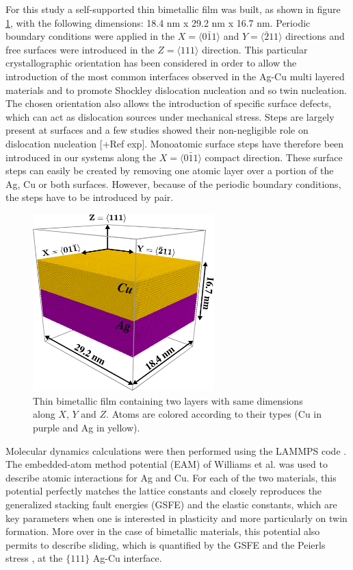 \documentclass[final,3p,times,twocolumn]{elsarticle}
\begin{document}
For this study a self-supported thin bimetallic film was built, as shown in figure \ref{fig_mod_geo}, with the following dimensions: 18.4 nm x 29.2 nm x 16.7 nm. Periodic boundary conditions were applied in the $X=\langle0\bar{1}1\rangle$ and $Y=\langle\bar{2}11\rangle$ directions and free surfaces were introduced in the $Z=\langle111\rangle$ direction. This particular crystallographic orientation has been considered in order to allow the introduction of the most common interfaces observed in the Ag-Cu multi layered materials and to promote Shockley dislocation nucleation and so twin nucleation. The chosen orientation also allows the introduction of specific surface defects, which can act as dislocation sources under mechanical stress. Steps are largely present at surfaces and a few studies showed their non-negligible role on dislocation nucleation \cite{brochard00PMA,hirel07SM} [+Ref exp]. Monoatomic surface steps have therefore been introduced in our systems along the $X=\langle0\bar{1}1\rangle$ compact direction. These surface steps can easily be created by removing one atomic layer over a portion of the Ag, Cu or both surfaces. However, because of the periodic boundary conditions, the steps have to be introduced by pair. 

\begin{figure}[!h]
	\begin{center}
		\includegraphics[width=70mm]{Pic/mod_geo.eps} 
	\end{center}
	\caption{Thin bimetallic film containing two layers with same dimensions along $X$, $Y$ and $Z$. Atoms are colored according to their types (Cu in purple and Ag in yellow).}\label{fig_mod_geo}
\end{figure}

Molecular dynamics calculations were then performed using the LAMMPS code \cite{plimpton95JCP}. The  embedded-atom method potential (EAM) of Williams et al. \cite{williams06MSMSE} was used to describe atomic interactions for Ag and Cu. For each of the two materials, this potential perfectly matches the lattice constants and closely reproduces the generalized stacking fault energies (GSFE) and the elastic constants, which are key parameters when one is interested in plasticity and more particularly on twin formation. More over in the case of bimetallic materials, this potential also permits to describe sliding, which is quantified by the GSFE and the Peierls stress \cite{li15PM}, at the $\lbrace111\rbrace$ Ag-Cu interface.
\end{document}

